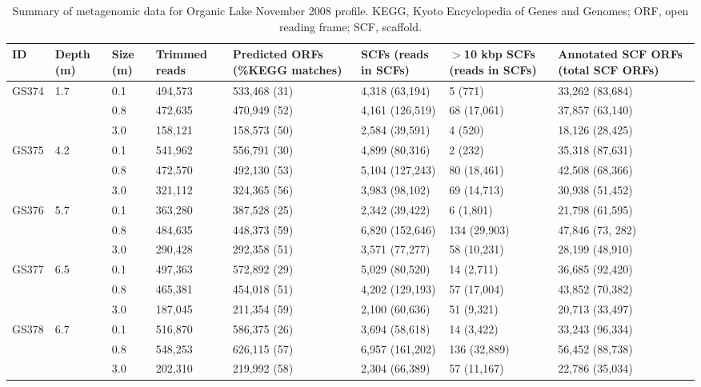 \begin{table}
\footnotesize
\caption[Summary of metagenomic data for Organic Lake profile]{Summary of metagenomic data for Organic Lake November 2008 profile. KEGG, Kyoto Encyclopedia of Genes and Genomes; ORF, open reading frame; SCF, scaffold.}
\label{tab:metag}
\smallskip
\begin{tabularx}{\textwidth}{p{0.7cm}p{0.8cm}p{0.6cm}p{1.2cm}p{1.8cm}Xp{1.8cm}X}
\toprule
\textbf{ID} & \textbf{Depth (m)} & \textbf{Size (\textmu{}m)} & \textbf{Trimmed reads} & \textbf{Predicted \acp{ORF} (\%\ac{KEGG} matches)} & \textbf{SCFs (reads in SCFs)} & \textbf{$>$10 kbp SCFs (reads in SCFs)} & \textbf{Annotated SCF \acp{ORF} (total SCF \acp{ORF})} \\
\midrule
GS374 & 1.7 & 0.1 & 494,573 & 533,468 (31) & 4,318 (63,194) & 5 (771) & 33,262 (83,684)\\
 &  & 0.8 & 472,635 & 470,949 (52) & 4,161 (126,519) & 68 (17,061) & 37,857 (63,140)\\
 &  & 3.0 & 158,121 & 158,573 (50) & 2,584 (39,591) & 4 (520) & 18,126 (28,425)\\
GS375 & 4.2 & 0.1 & 541,962 & 556,791 (30) & 4,899 (80,316) & 2 (232) & 35,318 (87,631)\\
 &  & 0.8 & 472,570 & 492,130 (53) & 5,104 (127,243) & 80 (18,461) & 42,508 (68,366)\\
 &  & 3.0 & 321,112 & 324,365 (56) & 3,983 (98,102) & 69 (14,713) & 30,938 (51,452)\\
GS376 & 5.7 & 0.1 & 363,280 & 387,528 (25) & 2,342 (39,422) & 6 (1,801) & 21,798 (61,595)\\
 &  & 0.8 & 484,635 & 448,373 (59) & 6,820 (152,646) & 134 (29,903) & 47,846 (73, 282)\\
 &  & 3.0 & 290,428 & 292,358 (51) & 3,571 (77,277) & 58 (10,231) & 28,199 (48,910)\\
GS377 & 6.5 & 0.1 & 497,363 & 572,892 (29) & 5,029 (80,520) & 14 (2,711) & 36,685 (92,420)\\
 &  & 0.8 & 465,381 & 454,018 (51) & 4,202 (129,193) & 57 (17,004) & 43,852 (70,382)\\
 &  & 3.0 & 187,045 & 211,354 (59) & 2,100 (60,636) & 51 (9,321) & 20,713 (33,497)\\
GS378 & 6.7 & 0.1 & 516,870 & 586,375 (26) & 3,694 (58,618) & 14 (3,422) & 33,243 (96,334)\\
 &  & 0.8 & 548,253 & 626,115 (57) & 6,957 (161,202) & 136 (32,889) & 56,452 (88,738)\\
 &  & 3.0 & 202,310 & 219,992 (58) & 2,304 (66,389) & 57 (11,167) & 22,786 (35,034)\\
\bottomrule
\end{tabularx}
\end{table}
